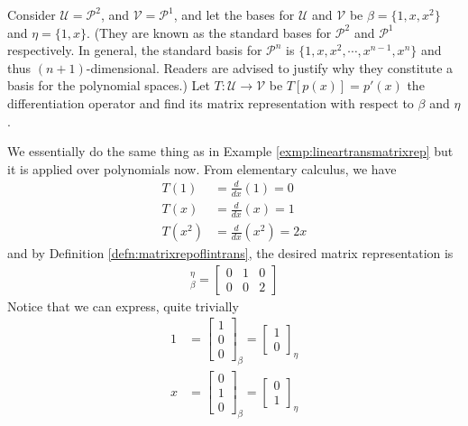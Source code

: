 \begin{exmp}
\label{exmp:lineartransderivative}
Consider $\mathcal{U} = \mathcal{P}^2$, and $\mathcal{V} = \mathcal{P}^1$, and let the bases for $\mathcal{U}$ and $\mathcal{V}$ be $\mathcal{\beta} = \{1, x, x^2\}$ and $\mathcal{\eta} = \{1, x\}$. (They are known as the standard bases for $\mathcal{P}^2$ and $\mathcal{P}^1$ respectively. In general, the standard basis for $\mathcal{P}^n$ is $\{1, x, x^2, \cdots, x^{n-1}, x^n\}$ and thus $(n+1)$-dimensional. Readers are advised to justify why they constitute a basis for the polynomial spaces.) Let $T: \mathcal{U} \to \mathcal{V}$ be $T[p(x)] = p'(x)$ the differentiation operator and find its matrix representation with respect to $\mathcal{\beta}$ and $\mathcal{\eta}$.
\end{exmp}
\begin{solution}
We essentially do the same thing as in Example \ref{exmp:lineartransmatrixrep} but it is applied over polynomials now. From elementary calculus, we have
\begin{align*}
T(1) &= \frac{d}{dx}(1) = 0 \\
T(x) &= \frac{d}{dx}(x) = 1 \\
T(x^2) &= \frac{d}{dx}(x^2) = 2x
\end{align*}
and by Definition \ref{defn:matrixrepoflintrans}, the desired matrix representation is
\begin{align*}
[T]_\beta^\eta = 
\begin{bmatrix}
0 & 1 & 0 \\
0 & 0 & 2
\end{bmatrix}
\end{align*}
Notice that we can express, quite trivially
\begin{align*}
1 &= \begin{bmatrix}
1 \\
0 \\
0
\end{bmatrix}_\beta
=
\begin{bmatrix}
1 \\
0
\end{bmatrix}_\eta \\
x &= \begin{bmatrix}
0 \\
1 \\
0
\end{bmatrix}_\beta
=
\begin{bmatrix}
0 \\
1
\end{bmatrix}_\eta \\

\end{align*}
\end{solution}

